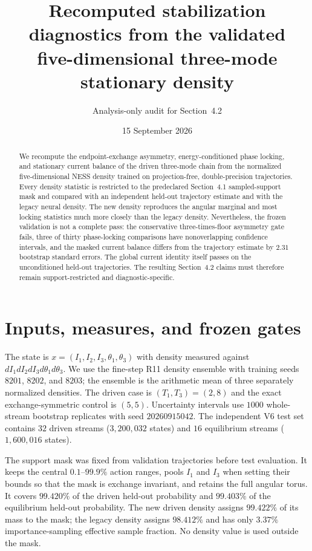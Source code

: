 \documentclass[10pt]{article}
\title{Recomputed stabilization diagnostics from the validated\\
five-dimensional three-mode stationary density}
\author{Analysis-only audit for Section~4.2}
\date{15 September 2026}
\begin{document}
\maketitle

\begin{abstract}
We recompute the endpoint-exchange asymmetry, energy-conditioned phase
locking, and stationary current balance of the driven three-mode chain from
the normalized five-dimensional NESS density trained on projection-free,
double-precision trajectories.  Every density statistic is restricted to the
predeclared Section~4.1 sampled-support mask and compared with an independent
held-out trajectory estimate and with the legacy neural density.  The new
density reproduces the angular marginal and most locking statistics much more
closely than the legacy density.  Nevertheless, the frozen validation is not a
complete pass: the conservative three-times-floor asymmetry gate fails, three
of thirty phase-locking comparisons have nonoverlapping confidence intervals,
and the masked current balance differs from the trajectory estimate by
$2.31$ bootstrap standard errors.  The global current identity itself passes
on the unconditioned held-out trajectories.  The resulting Section~4.2 claims
must therefore remain support-restricted and diagnostic-specific.
\end{abstract}

\section{Inputs, measures, and frozen gates}

The state is
$x=(I_1,I_2,I_3,\theta_1,\theta_3)$ with density measured against
$dI_1dI_2dI_3d\theta_1d\theta_3$.  We use the fine-step R11 density ensemble
with training seeds $8201$, $8202$, and $8203$; the ensemble is the arithmetic
mean of three separately normalized densities.  The driven case is
$(T_1,T_3)=(2,8)$ and the exact exchange-symmetric control is $(5,5)$.
Uncertainty intervals use $1000$ whole-stream bootstrap replicates with seed
$20260915042$.  The independent V6 test set contains $32$ driven streams
($3{,}200{,}032$ states) and $16$ equilibrium streams ($1{,}600{,}016$
states).

The support mask was fixed from validation trajectories before test
evaluation.  It keeps the central $0.1$--$99.9\%$ action ranges, pools $I_1$
and $I_3$ when setting their bounds so that the mask is exchange invariant,
and retains the full angular torus.  It covers $99.420\%$ of the driven
held-out probability and $99.403\%$ of the equilibrium held-out probability.
The new driven density assigns $99.422\%$ of its mass to the mask; the legacy
density assigns $98.412\%$ and has only $3.37\%$ importance-sampling effective
sample fraction.  No density value is used outside the mask.
\end{document}
